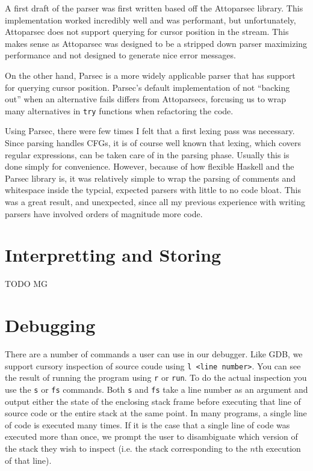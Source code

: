 \documentclass[letterpaper, 10pt]{article}
\newcommand{\ttt}{\texttt}
\begin{document}
A first draft of the parser was first written based off the Attoparsec
library. This implementation worked incredibly well and was performant,
but unfortunately, Attoparsec does not support querying for cursor
position in the stream. This makes sense as Attoparsec was designed to be
a stripped down parser maximizing performance and not designed to generate
nice error messages.

On the other hand, Parsec is a more widely applicable parser that has
support for querying cursor position. Parsec's default implementation of
not ``backing out'' when an alternative fails differs from Attoparsecs,
forcusing us to wrap many alternatives in \ttt{try} functions when
refactoring the code.

Using Parsec, there were few times I felt that a first lexing pass was
necessary. Since parsing handles CFGs, it is of course well
known that lexing, which covers regular expressions, can be taken care of
in the parsing phase. Usually this is done simply for
convenience. However, because of how flexible Haskell and the Parsec
library is, it was relatively simple to wrap the parsing of comments and
whitespace inside the typcial, expected parsers with little to no code
bloat. This was a great result, and unexpected, since all my previous
experience with writing parsers have involved orders of magnitude more
code.

\section{Interpretting and Storing}
TODO MG

\section{Debugging}
There are a number of commands a user can use in our debugger. Like GDB,
we support cursory inspection of source coude using
\ttt{l <line number>}. You can see the result of running the program using
\ttt{r} or \ttt{run}. To do the actual inspection you use the \ttt{s} or
\ttt{fs} commands. Both \ttt{s} and \ttt{fs} take a line number as an
argument and output either the state of the enclosing stack frame before
executing that line of source code or the entire stack at the same
point. In many programs, a single line of code is executed many times. If
it is the case that a single line of code was executed more than once, we
prompt the user to disambiguate which version of the stack they wish to
inspect (i.e. the stack corresponding to the $n$th execution of that
line).
\end{document}
